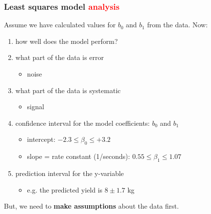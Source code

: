 \begin{frame}\frametitle{Least squares model \textcolor{red}{analysis}}
	
	Assume we have calculated values for $b_0$ and $b_1$ from the data. Now: 
	\begin{enumerate}
		\item	how well does the model perform? 
		\item	what part of the data is error 
		\begin{itemize}
			\item	noise 
		\end{itemize}
		\item	what part of the data is systematic 
		\begin{itemize}
			\item	signal 
		\end{itemize}
		\item	confidence interval for the model coefficients: $b_0$ and $b_1$ 
		\begin{itemize}
			\item	intercept: $-2.3 \leq \beta_0 \leq +3.2$ 
			\item	slope = rate constant (1/seconds): $0.55 \leq \beta_1 \leq 1.07$ 
		\end{itemize}
		\item	prediction interval for the y-variable 
		\begin{itemize}
			\item	e.g. the predicted yield is $8 \pm 1.7$ kg 
		\end{itemize}
	\end{enumerate}
	
	But, we need to \textbf{make assumptions} about the data first.
\end{frame}


